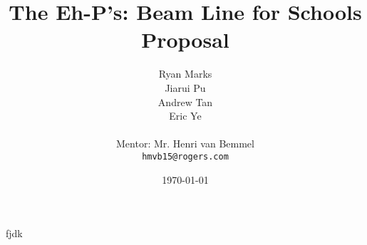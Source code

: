 \documentclass[12pt,letterpaper]{article}
\begin{document}
\title{The Eh-P's: Beam Line for Schools Proposal}
\author{
Ryan Marks\\
Jiarui Pu \\ 
Andrew Tan\\
Eric Ye\\
\\
Mentor: Mr. Henri van Bemmel\\
\normalsize{\texttt{hmvb15@rogers.com}}
}

\date{\today}
\maketitle
fjdk
\lipsum
\end{document}
